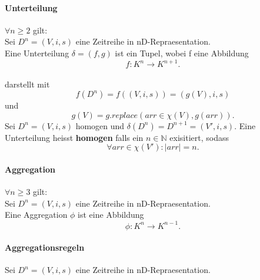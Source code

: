 \documentclass[12pt]{article}
\begin{document}
			\paragraph{Unterteilung}
				$\forall n \geq 2$ gilt:\\
				Sei $D^{n} = (V, i, s)$ eine Zeitreihe in nD-Repraesentation.\\[0.0cm]
				Eine Unterteilung $\delta = (f, g)$ ist ein Tupel, wobei f eine Abbildung 
				\begin{equation}
					f: K^{n} \rightarrow K^{n+1}.
				\end{equation}\\[0.3cm]
				darstellt mit
				\begin{equation}
					f(D^{n}) = f ((V,i,s)) = (g(V), i, s)
				\end{equation}
				und
				\begin{equation}
					g(V) = g.replace(arr \in \chi(V), g(arr)).
				\end{equation}
				Sei $D^{n} = (V, i, s)$ homogen und $\delta(D^{n}) = D^{n+1} = (V', i, s)$.
				Eine Unterteilung heisst \textbf{homogen} falls ein $n \in \mathbb{N}$ exisitiert, sodass
				\begin{equation}
					\forall arr \in \chi(V'): |arr| = n.
				\end{equation}
				
			\paragraph{Aggregation}
				$\forall n \geq 3$ gilt:\\
				Sei $D^{n} = (V, i, s)$ eine Zeitreihe in nD-Repraesentation.\\[0.3cm]
				Eine Aggregation $\phi$ ist eine Abbildung 
				\begin{equation}
					\phi: K^{n} \rightarrow K^{n-1}.
				\end{equation}
				
			\paragraph{Aggregationsregeln}
				Sei $D^{n} = (V, i, s)$ eine Zeitreihe in nD-Repraesentation.\\[0.3cm]
			
\end{document}
